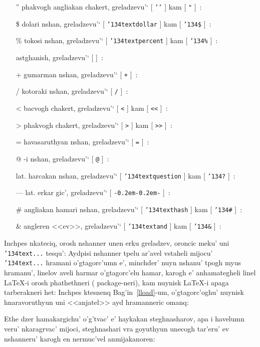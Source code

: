 \documentclass[12pt,a4paper]{article}
\def\mybs{\char'134}
\begin{document}
\begin{itemize}
\item[\artm '']\quad phakvogh angliakan chakert, greladzevu'`
  [ {\tt '{}'} ] kam [ {\tt "} ]~:
\item[\artm \$]\quad dolari nshan, greladzevu'`
  [ {\tt \mybs textdollar} ] kam [ {\tt \mybs\$} ]~:
\item[\artm \%]\quad tokosi nshan, greladzevu'` 
  [ {\tt \mybs textpercent} ] kam [ {\tt \mybs\%} ]~:
\item[\artm *]\quad astghanish, greladzevu'` [ {\tt *} ]~:
\item[\artm +]\quad gumarman nshan, greladzevu'` [ {\tt +} ]~:
\item[\artm /]\quad kotoraki nshan, greladzevu'` [ {\tt /} ]~:
\item[\artm <]\quad bacvogh chakert, greladzevu'` [ {\tt <} ] kam
  [ {\tt <<} ]~:
\item[\artm >]\quad phakvogh chakert, greladzevu'` [ {\tt >} ] kam
  [ {\tt >>} ]~:
\item[\artm =]\quad havasaruthyan nshan, greladzevu'` [ {\tt =} ]~:
\item[\artm @]-i nshan, greladzevu'` [ {\tt @} ]~:
\item[\artm \?]\quad lat. harcakan nshan, greladzevu'` 
  [ {\tt \mybs textquestion} ] kam [ {\tt \mybs?} ]~:
\item[\artm ---]\quad lat. erkar gic', greladzevu'`
  [ {\tt -{\kern0.2em}-{\kern0.2em}-} ]~:
\item[\artm \#]\quad angliakan hamari nshan, greladzevu'`
  [ {\tt \mybs texthash} ] kam [ {\tt \mybs\#} ]~:
\item[\artm \&]\quad angleren <<ev>>, greladzevu'` 
  [ {\tt \mybs textand} ] kam [ {\tt \mybs\&} ]~:
\end{itemize}

Inchpes nkateciq, orosh nshanner unen erku greladzev, oroncic meku' uni {\tt
\mybs text...} tesqu': Aydpisi nshanner tpelu ar'avel vstaheli mijocu' {\tt
\mybs text...} hramani o'gtagorc'umn e', minchder' nuyn nshanu' tpogh myus
hramanu', linelov aveli harmar o'gtagorc'elu hamar, karogh e'
an\-ha\-ma\-te\-ghe\-li linel {\aroff\LaTeX}-i orosh phathethneri ({\rm
package}-neri), kam nuynisk {\aroff\LaTeX}-i apaga tarberakneri het: Inchpes
ktesnenq Bag'in~\ref{lload}-um, o'gtagorc'oghu' nuynisk hnaravoruthyun uni
<<anjatel>> ayd hra\-man\-ne\-ric omanq:

Ethe dzer hamakargichu' o'g'tvac' e' haykakan steghnasharov, apa i havelumn
veru' nkaragrvac' mijoci, steghnashari vra goyuthyun unecogh tar'eru' ev 
nshanneru' karogh en nermuc'vel anmijakanoren:
\end{document}
